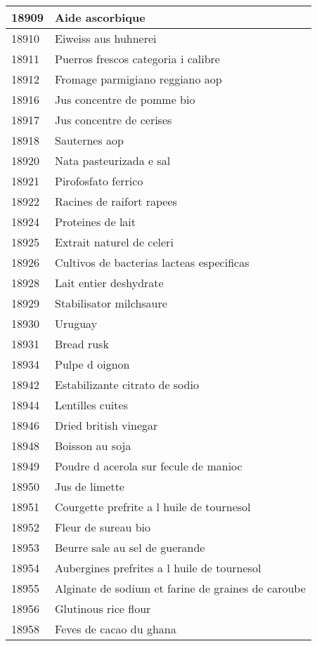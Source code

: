 \begin{longtable}{|l|l|}
18909 & Aide ascorbique \\ \hline 
18910 & Eiweiss aus huhnerei \\ \hline 
18911 & Puerros frescos categoria i calibre \\ \hline 
18912 & Fromage parmigiano reggiano aop \\ \hline 
18916 & Jus concentre de pomme bio \\ \hline 
18917 & Jus concentre de cerises \\ \hline 
18918 & Sauternes aop \\ \hline 
18920 & Nata pasteurizada e sal \\ \hline 
18921 & Pirofosfato ferrico \\ \hline 
18922 & Racines de raifort rapees \\ \hline 
18924 & Proteines de lait \\ \hline 
18925 & Extrait naturel de celeri \\ \hline 
18926 & Cultivos de bacterias lacteas especificas \\ \hline 
18928 & Lait entier deshydrate \\ \hline 
18929 & Stabilisator milchsaure \\ \hline 
18930 & Uruguay \\ \hline 
18931 & Bread rusk \\ \hline 
18934 & Pulpe d oignon \\ \hline 
18942 & Estabilizante citrato de sodio \\ \hline 
18944 & Lentilles cuites \\ \hline 
18946 & Dried british vinegar \\ \hline 
18948 & Boisson au soja \\ \hline 
18949 & Poudre d acerola sur fecule de manioc \\ \hline 
18950 & Jus de limette \\ \hline 
18951 & Courgette prefrite a l huile de tournesol \\ \hline 
18952 & Fleur de sureau bio \\ \hline 
18953 & Beurre sale au sel de guerande \\ \hline 
18954 & Aubergines prefrites a l huile de tournesol \\ \hline 
18955 & Alginate de sodium et farine de graines de caroube \\ \hline 
18956 & Glutinous rice flour \\ \hline 
18958 & Feves de cacao du ghana \\ \hline 

\end{longtable}
